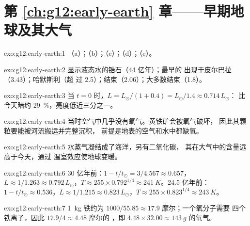 \section*{第 \ref{ch:g12:early-earth} 章——早期地球及其大气}

\begin{solution}{exo:g12:early-earth:1}
（a）；（b）；（c）；（d）；（e）。
\end{solution}

\begin{solution}{exo:g12:early-earth:2}
显示液态水的锆石（44 亿年）；最早的
出现于皮尔巴拉（3.43）；哈默斯利（超
过 2.5）；结束（2.06）；大多数结束（1.8）。
\end{solution}

\begin{solution}{exo:g12:early-earth:3}
当 $t = 0$ 时，$L = L_\odot/(1 + 0.4) = L_\odot/1.4 \approx 0.714\,L_\odot$：
比今天暗约 \qty{29}{\percent}，亮度低近三分之一。
\end{solution}

\begin{solution}{exo:g12:early-earth:4}
当时空气中几乎没有氧气。黄铁矿会被氧气破坏，
因此其颗粒要能被河流搬运并完整沉积，
前提是地表的空气和水中都缺氧。
\end{solution}

\begin{solution}{exo:g12:early-earth:5}
水蒸气凝结成了海洋，另有二氧化碳，
其在大气中的含量远高于今天，通过
温室效应使地球变暖。
\end{solution}

\begin{solution}{exo:g12:early-earth:6}
30 亿年前：$1 - t/t_\odot = 3/4.567 \approx 0.657$，$L \approx
1/1.263 \approx 0.792\,L_\odot$，$T \approx 255 \times 0.792^{1/4} \approx
\qty{241}{K}$。24.5 亿年前：$1 - t/t_\odot \approx 0.536$，$L
\approx 1/1.215 \approx 0.823\,L_\odot$，$T \approx 255 \times 0.823^{1/4}
\approx \qty{243}{K}$。
\end{solution}

\begin{solution}{exo:g12:early-earth:7}
\qty{1}{kg} 铁约为 $1000/55.85 \approx 17.9$ 摩尔；一个氧分子需要
四个铁离子，因此 $17.9/4 \approx 4.48$ 摩尔的
，即 $4.48 \times 32.00 \approx \qty{143}{g}$ 的氧气。
\end{solution}

